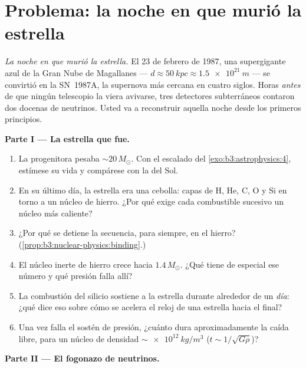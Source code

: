 \section{Problema: la noche en que murió la estrella}

\begin{problem}\label{pb:b3:astrophysics:1}
\emph{La noche en que murió la estrella.} El 23 de febrero de 1987, una
supergigante azul de la Gran Nube de Magallanes --- $d \approx
\qty{50}{kpc} \approx \qty{1.5e21}{m}$ --- se convirtió en la SN~1987A, la
supernova más cercana en cuatro siglos. Horas \emph{antes} de que ningún
telescopio la viera avivarse, tres detectores subterráneos contaron
dos docenas de neutrinos. Usted va a reconstruir aquella noche desde los primeros
principios.

\medskip\noindent\textbf{Parte I --- La estrella que fue.}

\begin{enumerate}
  \item La progenitora pesaba ${\sim}20\,M_\odot$. Con el
        escalado del \cref{exo:b3:astrophysics:4}, estímese su
        vida y compárese con la del Sol.
  \item En su último día, la estrella era una cebolla: capas de H, He, C, O y Si
        en torno a un núcleo de hierro. ¿Por qué exige cada
        combustible sucesivo un núcleo más caliente?
  \item ¿Por qué se detiene la secuencia, para siempre, en el hierro?
        (\cref{prop:b3:nuclear-physics:binding}.)
  \item El núcleo inerte de hierro crece hacia $1.4\,M_\odot$. ¿Qué tiene
        de especial ese número y qué presión falla
        allí?
  \item La combustión del silicio sostiene a la estrella durante alrededor de un
        \emph{día}: ¿qué dice eso sobre cómo se acelera el reloj
        de una estrella hacia el final?
  \item Una vez falla el sostén de presión, ¿cuánto dura aproximadamente la
        caída libre, para un núcleo de densidad
        $\sim\qty{e12}{kg/m^3}$ ($t \sim 1/\sqrt{G\rho}$)?
\end{enumerate}

\medskip\noindent\textbf{Parte II --- El fogonazo de neutrinos.}


\end{problem}
